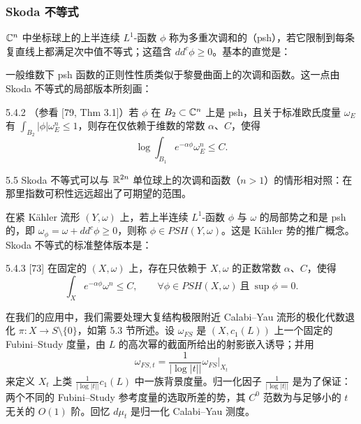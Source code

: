 \subsubsection{Skoda 不等式}

$\mathbb{C}^n$ 中坐标球上的上半连续 $L^1$-函数 $\phi$ 称为多重次调和的（psh），若它限制到每条复直线上都满足次中值不等式；这蕴含 $dd^c\phi\ge0$。基本的直觉是：

一般维数下 psh 函数的正则性性质类似于黎曼曲面上的次调和函数。这一点由 Skoda 不等式的局部版本所刻画：

\begin{theorem}{5.4.2}
（参看 [79, Thm 3.1]）若 $\phi$ 在 $B_2\subset\mathbb{C}^n$ 上是 psh，且关于标准欧氏度量 $\omega_E$ 有 $\int_{B_2}|\phi|\omega_E^n\le1$，则存在仅依赖于维数的常数 $\alpha$、$C$，使得
\[
\log\int_{B_1}e^{-\alpha\phi}\omega_E^n\le C.
\]
\end{theorem}

\begin{remark}{5.5}
Skoda 不等式可以与 $\mathbb{R}^{2n}$ 单位球上的次调和函数（$n>1$）的情形相对照：在那里指数可积性远远超出了可期望的范围。
\end{remark}


在紧 Kähler 流形 $(Y,\omega)$ 上，若上半连续 $L^1$-函数 $\phi$ 与 $\omega$ 的局部势之和是 psh 的，即 $\omega_\phi=\omega+dd^c\phi\ge0$，则称 $\phi\in PSH(Y,\omega)$。这是 Kähler 势的推广概念。Skoda 不等式的标准整体版本是：

\begin{theorem}{5.4.3}
[73] 在固定的 $(X,\omega)$ 上，存在只依赖于 $X,\omega$ 的正数常数 $\alpha$、$C$，使得
\[
\int_X e^{-\alpha\phi}\omega^n\le C,\qquad \forall\phi\in PSH(X,\omega)\ \text{且}\ \sup\phi=0.
\]
\end{theorem}

在我们的应用中，我们需要处理大复结构极限附近 Calabi--Yau 流形的极化代数退化 $\pi:X\to S\setminus\{0\}$，如第 5.3 节所述。设 $\omega_{FS}$ 是 $(X,c_1(L))$ 上一个固定的 Fubini--Study 度量，由 $L$ 的高次幂的截面所给出的射影嵌入诱导；并用
\[
\omega_{FS,t}=\frac{1}{|\log|t||}\omega_{FS}|_{X_t}
\]
来定义 $X_t$ 上类 $\frac{1}{|\log|t||}c_1(L)$ 中一族背景度量。归一化因子 $\frac{1}{|\log|t||}$ 是为了保证：两个不同的 Fubini--Study 参考度量的选取所差的势，其 $C^0$ 范数为与足够小的 $t$ 无关的 $O(1)$ 阶。回忆 $d\mu_t$ 是归一化 Calabi--Yau 测度。

